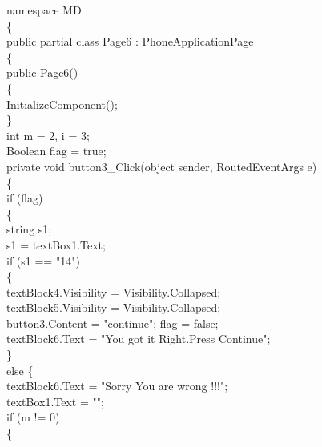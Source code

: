 {{namespace MD\\
\{\\
    public partial class Page6 : PhoneApplicationPage\\
    \{\\
        public Page6()\\
        \{\\
            InitializeComponent();\\
        \}\\
        int m = 2, i = 3;\\
        Boolean flag = true;\\
        private void button3_Click(object sender, RoutedEventArgs e)\\
        \{\\
            if (flag)\\
            \{\\
                string s1;\\
                s1 = textBox1.Text;\\
                if (s1 == "14")\\
                \{\\
                    textBlock4.Visibility = Visibility.Collapsed;\\
                    textBlock5.Visibility = Visibility.Collapsed;\\
                    button3.Content = "continue"; flag = false;\\
                    textBlock6.Text = "You got it Right.Press Continue";\\
                \}\\
                else
                \{\\
                    textBlock6.Text = "Sorry You are wrong !!!";\\
                    textBox1.Text = "";\\
                    if (m != 0)\\
                    \{\\

}}
